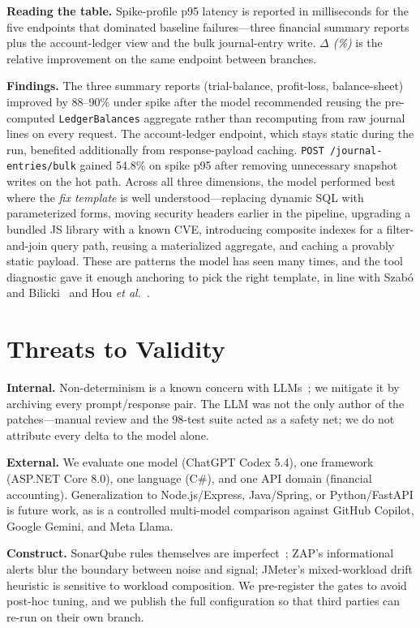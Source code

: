 \documentclass[conference]{IEEEtran}
\begin{document}
\textbf{Reading the table.} Spike-profile p95 latency is reported in milliseconds for the five endpoints that dominated baseline failures---three financial summary reports plus the account-ledger view and the bulk journal-entry write. \emph{$\Delta$ (\%)} is the relative improvement on the same endpoint between branches.

\textbf{Findings.} The three summary reports (trial-balance, profit-loss, balance-sheet) improved by 88--90\% under spike after the model recommended reusing the pre-computed \texttt{LedgerBalances} aggregate rather than recomputing from raw journal lines on every request. The account-ledger endpoint, which stays static during the run, benefited additionally from response-payload caching. \texttt{POST /journal-entries/bulk} gained 54.8\% on spike p95 after removing unnecessary snapshot writes on the hot path. Across all three dimensions, the model performed best where the \emph{fix template} is well understood---replacing dynamic SQL with parameterized forms, moving security headers earlier in the pipeline, upgrading a bundled JS library with a known CVE, introducing composite indexes for a filter-and-join query path, reusing a materialized aggregate, and caching a provably static payload. These are patterns the model has seen many times, and the tool diagnostic gave it enough anchoring to pick the right template, in line with Szab\'o and Bilicki~\cite{ref7} and Hou \textit{et al.}~\cite{ref14}.

\section{Threats to Validity}
\textbf{Internal.} Non-determinism is a known concern with LLMs~\cite{ref13}; we mitigate it by archiving every prompt/response pair. The LLM was not the only author of the patches---manual review and the 98-test suite acted as a safety net; we do not attribute every delta to the model alone.

\textbf{External.} We evaluate one model (ChatGPT Codex 5.4), one framework (ASP.NET Core 8.0), one language (C\#), and one API domain (financial accounting). Generalization to Node.js/Express, Java/Spring, or Python/FastAPI is future work, as is a controlled multi-model comparison against GitHub Copilot, Google Gemini, and Meta Llama.

\textbf{Construct.} SonarQube rules themselves are imperfect~\cite{ref15}; ZAP's informational alerts blur the boundary between noise and signal; JMeter's mixed-workload drift heuristic is sensitive to workload composition. We pre-register the gates to avoid post-hoc tuning, and we publish the full configuration so that third parties can re-run on their own branch.
\end{document}
